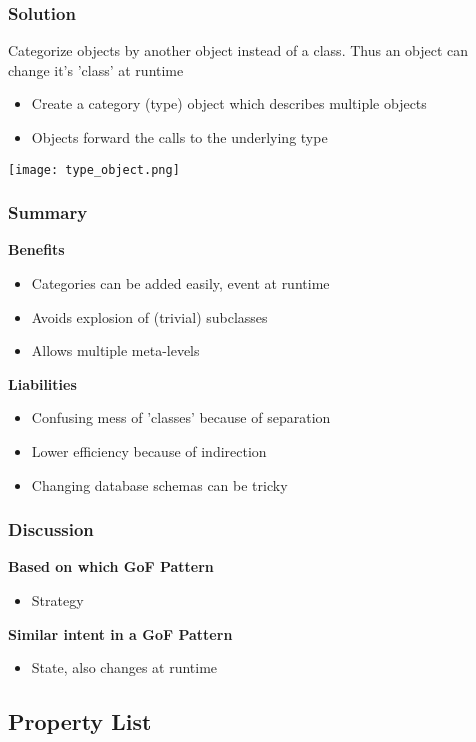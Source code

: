 \subsubsection{Solution}
Categorize objects by another object instead of a class. Thus an object can change it's 'class' at runtime
\begin{itemize}[topsep=0pt]
    \itemsep -0.4em
    \item Create a category (type) object which describes multiple objects
    \item Objects forward the calls to the underlying type
\end{itemize}
\texttt{[image: type\_object.png]}
\subsubsection{Summary}
\textbf{Benefits}
\begin{itemize}[topsep=0pt]
    \itemsep -0.4em
    \item Categories can be added easily, event at runtime
    \item Avoids explosion of (trivial) subclasses
    \item Allows multiple meta-levels
\end{itemize}
\textbf{Liabilities}
\begin{itemize}[topsep=0pt]
    \itemsep -0.4em
    \item Confusing mess of 'classes' because of separation
    \item Lower efficiency because of indirection
    \item Changing database schemas can be tricky
\end{itemize}
\subsubsection{Discussion}
\textbf{Based on which GoF Pattern}
\begin{itemize}[topsep=0pt]
    \itemsep -0.4em
    \item Strategy
\end{itemize}
\textbf{Similar intent in a GoF Pattern}
\begin{itemize}[topsep=0pt]
    \itemsep -0.4em
    \item State, also changes at runtime
\end{itemize}

\subsection{Property List}
